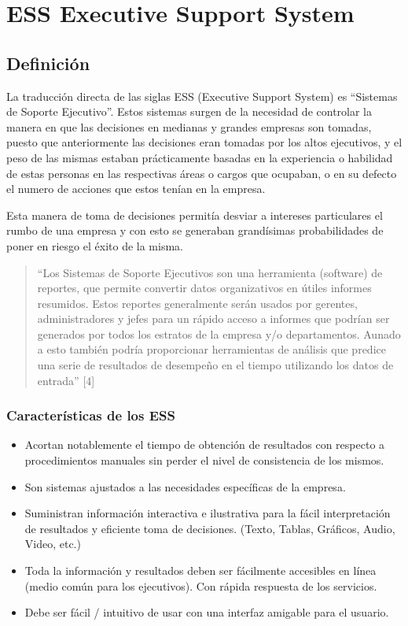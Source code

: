\chapter[ESS]{ESS Executive Support System}
\section {Definición}
La traducción directa de las siglas ESS (Executive Support System) es “Sistemas de Soporte Ejecutivo”. Estos sistemas surgen de la necesidad de controlar la manera en que las decisiones en medianas y grandes empresas son tomadas, puesto que anteriormente las decisiones eran tomadas por los altos ejecutivos, y el peso de las mismas estaban prácticamente basadas en la experiencia o habilidad de estas personas en las respectivas áreas o cargos que ocupaban, o en su defecto el numero de acciones que estos tenían en la empresa.

Esta manera de toma de decisiones permitía desviar a intereses particulares el rumbo de una empresa y con esto se generaban grandísimas probabilidades de poner en riesgo el éxito de la misma.

\begin{quote}
“Los Sistemas de Soporte Ejecutivos son una herramienta (software) de reportes, que permite convertir datos organizativos en útiles informes resumidos. Estos reportes generalmente serán usados por gerentes, administradores y jefes para un rápido acceso a informes que podrían ser generados por todos los estratos de la empresa y/o departamentos. 
Aunado a esto también podría proporcionar herramientas de análisis que predice una serie de resultados de desempeño en el tiempo utilizando los datos de entrada” [4]
\end{quote}
\subsection{Características de los ESS} 
\begin{itemize}
\item Acortan notablemente el tiempo de obtención de resultados con respecto a procedimientos manuales sin perder el nivel de consistencia de los mismos.
\item Son sistemas ajustados a las necesidades específicas de la empresa.
\item Suministran información interactiva e ilustrativa para la fácil interpretación de resultados y eficiente toma de decisiones. (Texto, Tablas, Gráficos, Audio, Video, etc.)
\item Toda la información y resultados deben ser fácilmente accesibles en línea (medio común para los ejecutivos). Con rápida respuesta de los servicios.
\item Debe ser fácil / intuitivo de usar con una interfaz amigable para el usuario.
\end{itemize}
